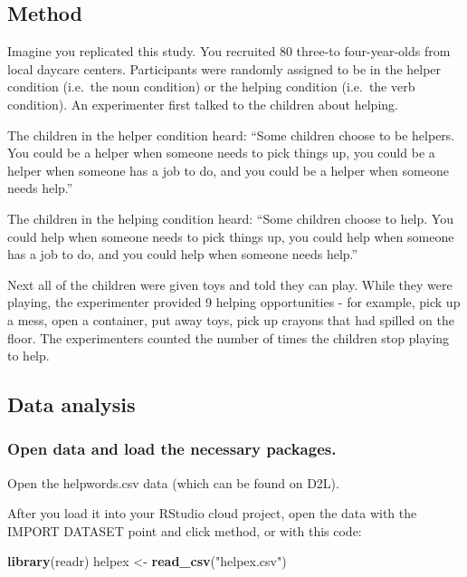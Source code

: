 \documentclass[
]{book}
\newenvironment{Shaded}{\begin{snugshade}}{\end{snugshade}}
\newcommand{\KeywordTok}[1]{\textcolor[rgb]{0.13,0.29,0.53}{\textbf{#1}}}
\newcommand{\NormalTok}[1]{#1}
\newcommand{\StringTok}[1]{\textcolor[rgb]{0.31,0.60,0.02}{#1}}
\begin{document}
\hypertarget{method}{%
\subsection{Method}\label{method}}

Imagine you replicated this study. You recruited 80 three-to four-year-olds from local daycare centers. Participants were randomly assigned to be in the helper condition (i.e.~the noun condition) or the helping condition (i.e.~the verb condition). An experimenter first talked to the children about helping.

The children in the helper condition heard: ``Some children choose to be helpers. You could be a helper when someone needs to pick things up, you could be a helper when someone has a job to do, and you could be a helper when someone needs help.''

The children in the helping condition heard: ``Some children choose to help. You could help when someone needs to pick things up, you could help when someone has a job to do, and you could help when someone needs help.''

Next all of the children were given toys and told they can play. While they were playing, the experimenter provided 9 helping opportunities - for example, pick up a mess, open a container, put away toys, pick up crayons that had spilled on the floor. The experimenters counted the number of times the children stop playing to help.

\hypertarget{data-analysis}{%
\subsection{Data analysis}\label{data-analysis}}

\hypertarget{open-data-and-load-the-necessary-packages.}{%
\subsubsection{Open data and load the necessary packages.}\label{open-data-and-load-the-necessary-packages.}}

Open the helpwords.csv data (which can be found on D2L).

After you load it into your RStudio cloud project, open the data with the IMPORT DATASET point and click method, or with this code:

\begin{Shaded}
\begin{Highlighting}[]
\KeywordTok{library}\NormalTok{(readr)}
\NormalTok{helpex <-}\StringTok{ }\KeywordTok{read_csv}\NormalTok{(}\StringTok{"helpex.csv"}\NormalTok{)}
\end{Highlighting}
\end{Shaded}
\end{document}
